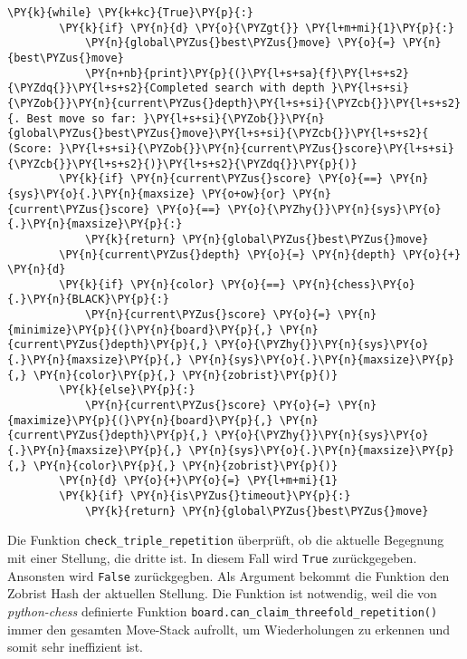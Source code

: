 \begin{tcolorbox}[fontupper=\linespread{.66}\selectfont, breakable, size=fbox, boxrule=1pt, pad at break*=1mm,colback=cellbackground, colframe=cellborder]
\begin{Verbatim}[commandchars=\\\{\}]
    \PY{k}{while} \PY{k+kc}{True}\PY{p}{:}
        \PY{k}{if} \PY{n}{d} \PY{o}{\PYZgt{}} \PY{l+m+mi}{1}\PY{p}{:}
            \PY{n}{global\PYZus{}best\PYZus{}move} \PY{o}{=} \PY{n}{best\PYZus{}move}
            \PY{n+nb}{print}\PY{p}{(}\PY{l+s+sa}{f}\PY{l+s+s2}{\PYZdq{}}\PY{l+s+s2}{Completed search with depth }\PY{l+s+si}{\PYZob{}}\PY{n}{current\PYZus{}depth}\PY{l+s+si}{\PYZcb{}}\PY{l+s+s2}{. Best move so far: }\PY{l+s+si}{\PYZob{}}\PY{n}{global\PYZus{}best\PYZus{}move}\PY{l+s+si}{\PYZcb{}}\PY{l+s+s2}{ (Score: }\PY{l+s+si}{\PYZob{}}\PY{n}{current\PYZus{}score}\PY{l+s+si}{\PYZcb{}}\PY{l+s+s2}{)}\PY{l+s+s2}{\PYZdq{}}\PY{p}{)}
        \PY{k}{if} \PY{n}{current\PYZus{}score} \PY{o}{==} \PY{n}{sys}\PY{o}{.}\PY{n}{maxsize} \PY{o+ow}{or} \PY{n}{current\PYZus{}score} \PY{o}{==} \PY{o}{\PYZhy{}}\PY{n}{sys}\PY{o}{.}\PY{n}{maxsize}\PY{p}{:}
            \PY{k}{return} \PY{n}{global\PYZus{}best\PYZus{}move}
        \PY{n}{current\PYZus{}depth} \PY{o}{=} \PY{n}{depth} \PY{o}{+} \PY{n}{d}
        \PY{k}{if} \PY{n}{color} \PY{o}{==} \PY{n}{chess}\PY{o}{.}\PY{n}{BLACK}\PY{p}{:}
            \PY{n}{current\PYZus{}score} \PY{o}{=} \PY{n}{minimize}\PY{p}{(}\PY{n}{board}\PY{p}{,} \PY{n}{current\PYZus{}depth}\PY{p}{,} \PY{o}{\PYZhy{}}\PY{n}{sys}\PY{o}{.}\PY{n}{maxsize}\PY{p}{,} \PY{n}{sys}\PY{o}{.}\PY{n}{maxsize}\PY{p}{,} \PY{n}{color}\PY{p}{,} \PY{n}{zobrist}\PY{p}{)}
        \PY{k}{else}\PY{p}{:}
            \PY{n}{current\PYZus{}score} \PY{o}{=} \PY{n}{maximize}\PY{p}{(}\PY{n}{board}\PY{p}{,} \PY{n}{current\PYZus{}depth}\PY{p}{,} \PY{o}{\PYZhy{}}\PY{n}{sys}\PY{o}{.}\PY{n}{maxsize}\PY{p}{,} \PY{n}{sys}\PY{o}{.}\PY{n}{maxsize}\PY{p}{,} \PY{n}{color}\PY{p}{,} \PY{n}{zobrist}\PY{p}{)}
        \PY{n}{d} \PY{o}{+}\PY{o}{=} \PY{l+m+mi}{1}
        \PY{k}{if} \PY{n}{is\PYZus{}timeout}\PY{p}{:}
            \PY{k}{return} \PY{n}{global\PYZus{}best\PYZus{}move}
\end{Verbatim}
\end{tcolorbox}

    Die Funktion \texttt{check\_triple\_repetition} überprüft, ob die
aktuelle Begegnung mit einer Stellung, die dritte ist. In diesem Fall
wird \texttt{True} zurückgegeben. Ansonsten wird \texttt{False}
zurückgegben. Als Argument bekommt die Funktion den Zobrist Hash der
aktuellen Stellung. Die Funktion ist notwendig, weil die von
\emph{python-chess} definierte Funktion
\texttt{board.can\_claim\_threefold\_repetition()} immer den gesamten
Move-Stack aufrollt, um Wiederholungen zu erkennen und somit sehr
ineffizient ist.

\bigskip

